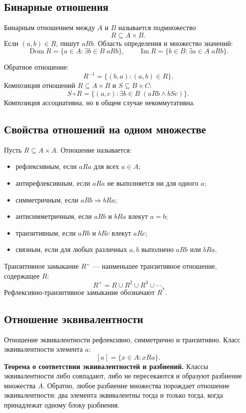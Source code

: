 \subsection{Бинарные отношения}

Бинарным отношением между $A$ и $B$ называется подмножество
\[
    R\subseteq A\times B.
\]
Если $(a,b)\in R$, пишут $aRb$. Область определения и множество значений:
\[
\operatorname{Dom}R=\{a\in A:\exists b\in B\;aRb\},
\qquad
\operatorname{Im}R=\{b\in B:\exists a\in A\;aRb\}.
\]

Обратное отношение:
\[
    R^{-1}=\{(b,a):(a,b)\in R\}.
\]
Композиция отношений $R\subseteq A\times B$ и $S\subseteq B\times C$:
\[
    S\circ R=
    \{(a,c):\exists b\in B\;(aRb\land bSc)\}.
\]
Композиция ассоциативна, но в общем случае некоммутативна.

\subsection{Свойства отношений на одном множестве}

Пусть $R\subseteq A\times A$. Отношение называется:
\begin{itemize}
    \item рефлексивным, если $aRa$ для всех $a\in A$;
    \item антирефлексивным, если $aRa$ не выполняется ни для одного $a$;
    \item симметричным, если $aRb\Rightarrow bRa$;
    \item антисимметричным, если $aRb$ и $bRa$ влекут $a=b$;
    \item транзитивным, если $aRb$ и $bRc$ влекут $aRc$;
    \item связным, если для любых различных $a,b$ выполнено $aRb$ или $bRa$.
\end{itemize}

Транзитивное замыкание $R^+$ --- наименьшее транзитивное отношение,
содержащее $R$:
\[
    R^+=R\cup R^2\cup R^3\cup\cdots.
\]
Рефлексивно-транзитивное замыкание обозначают $R^*$.

\subsection{Отношение эквивалентности}

Отношение эквивалентности рефлексивно, симметрично и транзитивно. Класс
эквивалентности элемента $a$:
\[
    [a]=\{x\in A:xRa\}.
\]
\textbf{Теорема о соответствии эквивалентностей и разбиений.}
Классы эквивалентности либо совпадают, либо не пересекаются и образуют разбиение
множества $A$. Обратно, любое разбиение множества порождает отношение
эквивалентности: два элемента эквивалентны тогда и только тогда, когда
принадлежат одному блоку разбиения.

